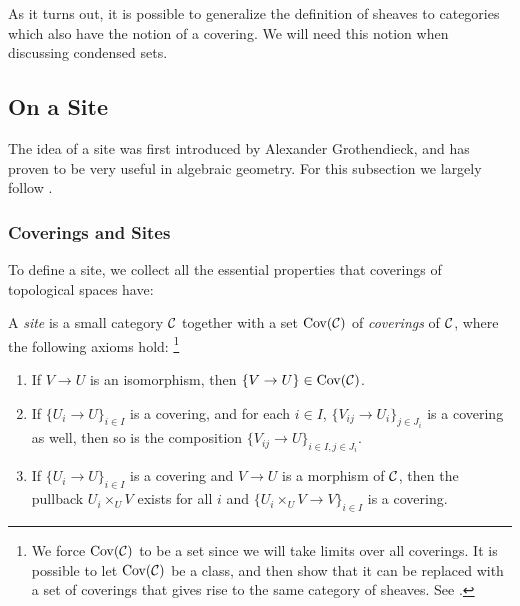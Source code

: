 \documentclass{article}
\DeclareMathOperator{\Cov}{Cov}
\begin{document}
As it turns out, it is possible to generalize
the definition of sheaves to categories which
also have the notion of a covering. We will
need this notion when discussing condensed sets.
\subsection{On a Site}

The idea of a site was first introduced by
Alexander Grothendieck, and has proven to be
very useful in algebraic geometry.
For this subsection we largely follow
\cite[Part 1, Chapter 7]{stacks-project}.

\subsubsection{Coverings and Sites}

To define a site, we collect all the essential
properties that coverings of topological spaces have:
\begin{definition}
    A \emph{site} is a small category $\mathcal{C}$ together
    with a set $\Cov(\mcC)$ of \emph{coverings} of
    $\mathcal{C}$, where the following axioms hold:
    \footnote{We force $\Cov(\mcC)$ to be a set since we will take limits
        over all coverings. It is possible to let $\Cov(\mcC)$ be a class,
        and then show that it can be replaced with a set of coverings
        that gives rise to the same category of sheaves.
        See \cite[Remark 7.6.3]{stacks-project}.}
    \begin{enumerate}
        \item If $V \to U$ is an isomorphism, then $\{V \to U\}\in \Cov(\mcC)$.
        \item If $\{U_i \to U\}_{i\in I}$ is a covering, and for each $i\in I$,
              $\{V_{ij} \to U_i\}_{j \in J_i}$ is a covering as well, then so is the
              composition $\{V_{ij} \to U\}_{i\in I, j\in J_i}$.
        \item If $\{U_i \to U\}_{i\in I}$ is a covering and $V \to U$ is a morphism
              of $\mathcal{C}$, then the pullback $U_i\times_U V$ exists for all $i$
              and $\{U_i\times_U V \to V\}_{i\in I}$ is a covering.
    \end{enumerate}
\end{definition}
\end{document}

